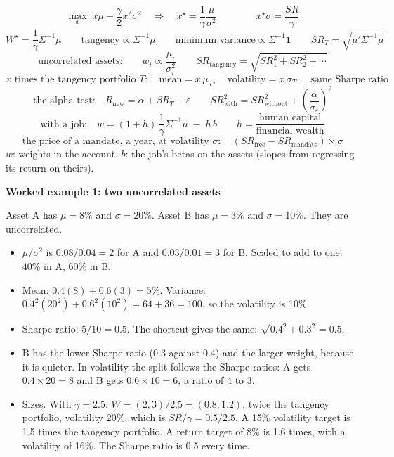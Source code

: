 \documentclass[11pt]{article}
\newcounter{ex}[section]
\newcommand{\head}[1]{\par\medskip\textbf{#1}\par}
\newcommand{\SR}{\mathit{SR}}
\begin{document}
\begin{keybox}
\[ \max_{x}\; x\mu - \frac{\gamma}{2}x^{2}\sigma^{2} \quad\Longrightarrow\quad
   x^{\star} = \frac{1}{\gamma}\frac{\mu}{\sigma^{2}} \qquad\qquad x^{\star}\sigma = \frac{\SR}{\gamma} \]
\[ W^{\star} = \frac{1}{\gamma}\Sigma^{-1}\mu \qquad \text{tangency} \propto \Sigma^{-1}\mu \qquad
   \text{minimum variance} \propto \Sigma^{-1}\mathbf{1} \qquad \SR_{T} = \sqrt{\mu'\Sigma^{-1}\mu} \]
\[ \text{uncorrelated assets:}\qquad w_{i} \propto \frac{\mu_{i}}{\sigma_{i}^{2}} \qquad
   \SR_{\text{tangency}} = \sqrt{\SR_{1}^{2} + \SR_{2}^{2} + \cdots} \]
\[ x \text{ times the tangency portfolio } T:\quad \text{mean} = x\,\mu_{T}, \quad
   \text{volatility} = x\,\sigma_{T}, \quad \text{same Sharpe ratio} \]
\[ \text{the alpha test:}\quad R_{\text{new}} = \alpha + \beta R_{T} + \varepsilon \qquad
   \SR^{2}_{\text{with}} = \SR^{2}_{\text{without}} + \left(\frac{\alpha}{\sigma_{\varepsilon}}\right)^{2} \]
\[ \text{with a job:}\quad w = (1+h)\,\frac{1}{\gamma}\Sigma^{-1}\mu \;-\; h\,b \qquad h = \frac{\text{human capital}}{\text{financial wealth}} \]
\[ \text{the price of a mandate, a year, at volatility } \sigma:\quad (\SR_{\text{free}} - \SR_{\text{mandate}})\times\sigma \]
{\small $w$: weights in the account. $b$: the job's betas on the assets (slopes from regressing its return on theirs).}
\end{keybox}

\head{Worked example 1: two uncorrelated assets}
Asset A has $\mu = 8\%$ and $\sigma = 20\%$. Asset B has $\mu = 3\%$ and $\sigma = 10\%$. They are uncorrelated.
\begin{itemize}
\item $\mu/\sigma^{2}$ is $0.08/0.04 = 2$ for A and $0.03/0.01 = 3$ for B. Scaled to add to one: 40\% in A, 60\% in B.
\item Mean: $0.4(8) + 0.6(3) = 5\%$. Variance: $0.4^{2}(20^{2}) + 0.6^{2}(10^{2}) = 64 + 36 = 100$, so the volatility is 10\%.
\item Sharpe ratio: $5/10 = 0.5$. The shortcut gives the same: $\sqrt{0.4^{2} + 0.3^{2}} = 0.5$.
\item B has the lower Sharpe ratio (0.3 against 0.4) and the larger weight, because it is quieter. In volatility the split
follows the Sharpe ratios: A gets $0.4\times 20 = 8$ and B gets $0.6\times 10 = 6$, a ratio of 4 to 3.
\item Sizes. With $\gamma = 2.5$: $W = (2, 3)/2.5 = (0.8, 1.2)$, twice the tangency portfolio, volatility 20\%, which is
$\SR/\gamma = 0.5/2.5$. A 15\% volatility target is 1.5 times the tangency portfolio. A return target of 8\% is 1.6 times,
with a volatility of 16\%. The Sharpe ratio is 0.5 every time.
\end{itemize}
\end{document}
